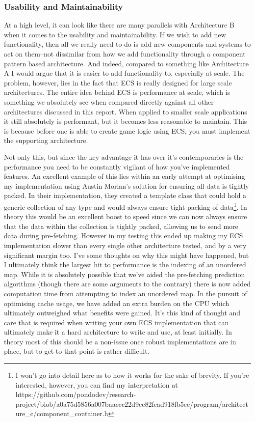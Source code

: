 \documentclass{article}
\begin{document}
\subsubsection{Usability and Maintainability}
At a high level, it can look like there are many parallels with Architecture B
when it comes to the usability and maintainability. If we wish to add new
functionality, then all we really need to do is add new components and systems
to act on them--not dissimilar from how we add functionality through a component
pattern based architecture. And indeed, compared to something like Architecture
A I would argue that it is easier to add functionality to, especially at scale.
The problem, however, lies in the fact that ECS is really designed for large
scale architectures. The entire idea behind ECS is performance at scale, which
is something we absolutely see when compared directly against all other
architectures discussed in this report. When applied to smaller scale
applications it still absolutely is performant, but it becomes less reasonable
to maintain. This is because before one is able to create game logic using ECS,
you must implement the supporting architecture.

Not only this, but since the key advantage it has over it's contemporaries is
the performance you need to be constantly vigilant of how you've implemented
features. An excellent example of this lies within an early attempt at
optimising my implementation using Austin Morlan's solution for ensuring all
data is tightly packed. In their implementation, they created a template class
that could hold a generic collection of any type and would always ensure tight
packing of data\footnote{I won't go into detail here as to how it works for the
sake of brevity. If you're interested, however, you can find my interpretation
at https://github.com/pondodev/research-project/blob/a0a75d5856a007baaeec22d9ce82fcad918fb5ee/program/architecture\_c/component\_container.h}.
In theory this would be an excellent boost to speed since we can now always
ensure that the data within the collection is tightly packed, allowing us to
send more data during pre-fetching. However in my testing this ended up making
my ECS implementation slower than every single other architecture tested, and by
a very significant margin too. I've some thoughts on why this might have
happened, but I ultimately think the largest hit to performance is the indexing
of an unordered map. While it is absolutely possible that we've aided the
pre-fetching prediction algorithms (though there are some arguments to the
contrary) there is now added computation time from attempting to index an
unordered map. In the pursuit of optimising cache usage, we have added an extra
burden on the CPU which ultimately outweighed what benefits were gained. It's
this kind of thought and care that is required when writing your own ECS
implementation that can ultimately make it a hard architecture to write and use,
at least initially. In theory most of this should be a non-issue once robust
implementations are in place, but to get to that point is rather difficult.
\end{document}
